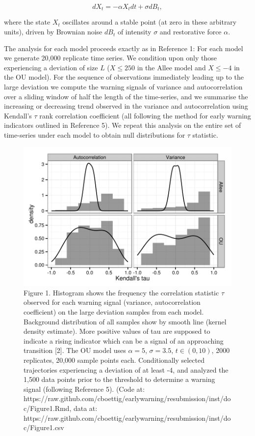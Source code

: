 \documentclass{article}
\begin{document}
\[ dX_t = - \alpha X_t dt + \sigma dB_t, \]

where the state $X_t$ oscillates around a stable point (at zero in these
arbitrary units), driven by Brownian noise $dB_t$ of intensity $\sigma$
and restorative force $\alpha$.

The analysis for each model proceeds exactly as in Reference 1: For each
model we generate 20,000 replicate time series. We condition upon only
those experiencing a deviation of size $L$ ($X \leq 250$ in the Allee
model and $X \leq -4$ in the OU model). For the sequence of observations
immediately leading up to the large deviation we compute the warning
signals of variance and autocorrelation over a sliding window of half
the length of the time-series, and we summarise the increasing or
decreasing trend observed in the variance and autocorrelation using
Kendall's $\tau$ rank correlation coefficient (all following the method
for early warning indicators outlined in Reference 5). We repeat this
analysis on the entire set of time-series under each model to obtain
null distributions for $\tau$ statistic.

\begin{figure}[htbp]
\centering
\includegraphics{Figure1.pdf}
\caption{Figure 1. Histogram shows the frequency the correlation
statistic $\tau$ observed for each warning signal (variance,
autocorrelation coefficient) on the large deviation samples from each
model. Background distribution of all samples show by smooth line
(kernel density estimate). More positive values of tau are supposed to
indicate a rising indicator which can be a signal of an approaching
transition {[}2{]}. The OU model uses $\alpha = 5$, $\sigma=3.5$,
$t \in (0, 10)$, 2000 replicates, 20,000 sample points each.
Conditionally selected trajectories experiencing a deviation of at least
-4, and analyzed the 1,500 data points prior to the threshold to
determine a warning signal (following Reference 5). (Code at:
https://raw.github.com/cboettig/earlywarning/resubmission/inst/doc/Figure1.Rmd,
data at:
https://raw.github.com/cboettig/earlywarning/resubmission/inst/doc/Figure1.csv}
\end{figure}
\end{document}
